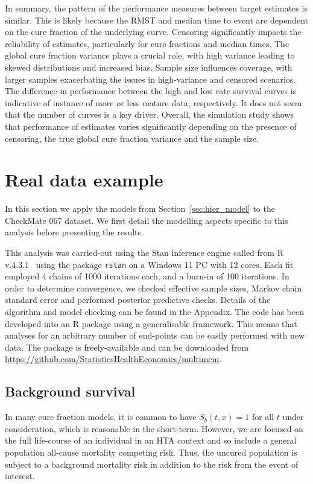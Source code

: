 \documentclass[AMA,STIX1COL]{WileyNJD-v2}
\begin{document}
In summary, the pattern of the performance measures between target estimates is similar. This is likely because the RMST and median time to event are dependent on the cure fraction of the underlying curve. Censoring significantly impacts the reliability of estimates, particularly for cure fractions and median times. The global cure fraction variance plays a crucial role, with high variance leading to skewed distributions and increased bias. Sample size influences coverage, with larger samples exacerbating the issues in high-variance and censored scenarios. The difference in performance between the high and low rate survival curves is indicative of instance of more or less mature data, respectively. It does not seem that the number of curves is a key driver. Overall, the simulation study shows that performance of estimates varies significantly depending on the presence of censoring, the true global cure fraction variance and the sample size.


%
\section{Real data example}\label{sec:application}
In this section we apply the models from Section~\ref{sec:hier_model} to the CheckMate 067 dataset. We first detail the modelling aspects specific to this analysis before presenting the results.

This analysis was carried-out using the Stan inference engine \cite{carpenter2017stan} called from R v.4.3.1~\cite{Rcoreteam} using the package \texttt{rstan} on a Windows 11 PC with 12 cores. Each fit employed 4 chains of 1000 iterations each, and a burn-in of 100 iterations. In order to determine convergence, we checked effective sample sizes, Markov chain standard error and performed posterior predictive checks. Details of the algorithm and model checking can be found in the Appendix.
The code has been developed into an R package using a generalisable framework. This means that analyses for an arbitrary number of end-points can be easily performed with new data. The package is freely-available and can be downloaded from \url{https://github.com/StatisticsHealthEconomics/multimcm}.

%
\subsection{Background survival}
In many cure fraction models, it is common to have $S_b(t, x) = 1$ for all $t$ under consideration, which is reasonable in the short-term.
However, we are focused on the full life-course of an individual in an HTA context and so include a general population all-cause mortality competing risk.
Thus, the uncured population is subject to a background mortality risk in addition to the risk from the event of interest.
\end{document}
